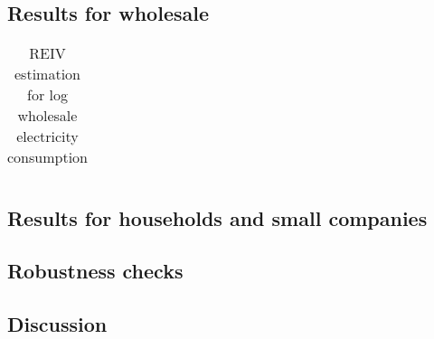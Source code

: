 \label{sec:results}
\subsection{Results for wholesale}
\label{subsec:r_wholesale}

\begin{table}[H]
  \vspace{-0.0cm}
  \centering
  \caption{REIV estimation for log wholesale electricity consumption}
  \footnotesize
    \begin{tabular}{lc}
      \toprule
        
    \end{tabular}
  \label{tab:ws_preferred}
  \vspace{-0.0cm}
\end{table}

\subsection{Results for households and small companies}
\label{subsec:r_wholesale}

%         


\subsection{Robustness checks}
\label{subsec:r_robustness}

\subsection{Discussion}
\label{subsec:discussion}
